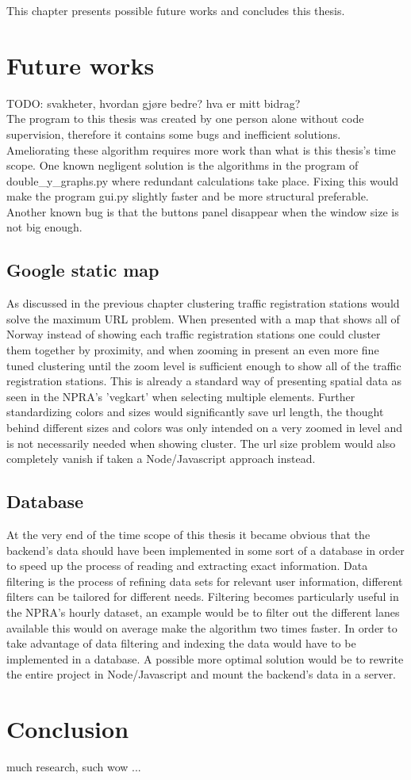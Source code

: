 This chapter presents possible future works and concludes this thesis.


\section{Future works}
TODO: svakheter, hvordan gjøre bedre? hva er mitt bidrag?  \\

The program to this thesis was created by one person alone without code supervision, therefore it contains some bugs and inefficient solutions. Ameliorating these algorithm requires more work than what is this thesis's time scope. One known negligent solution is the algorithms in the program of double\_y\_graphs.py where redundant calculations take place. Fixing this would make the program gui.py slightly faster and be more structural preferable. Another known bug is that the buttons panel disappear when the window size is not big enough.

\subsection{Google static map}
As discussed in the previous chapter clustering traffic registration stations would solve the maximum URL problem. When presented with a map that shows all of Norway instead of showing each traffic registration stations one could cluster them together by proximity, and when zooming in present an even more fine tuned clustering until the zoom level is sufficient enough to show all of the traffic registration stations. This is already a standard way of presenting spatial data as seen in the NPRA's 'vegkart'\cite{vegkart} when selecting multiple elements. Further standardizing colors and sizes would significantly save url length, the thought behind different sizes and colors was only intended on a very zoomed in level and is not necessarily needed when showing cluster. The url size problem would also completely vanish if taken a Node/Javascript approach instead. 

\subsection{Database}
At the very end of the time scope of this thesis it became obvious that the backend's data should have been implemented in some sort of a database in order to speed up the process of reading and extracting exact information. Data filtering is the process of refining data sets for relevant user information, different filters can be tailored for different needs. Filtering becomes particularly useful in the NPRA's hourly dataset, an example would be to filter out the different lanes available this would on average make the algorithm two times faster. In order to take advantage of data filtering and indexing the data would have to be implemented in a database. A possible more optimal solution would be to rewrite the entire project in Node/Javascript and mount the backend's data in a server.




\section{Conclusion}
much research, such wow ...